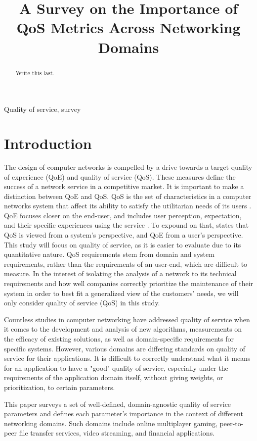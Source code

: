 \documentclass{article}
\title{A Survey on the Importance of QoS Metrics Across Networking Domains}
\begin{document}
%
\maketitle
%
\begin{abstract}
Write this last.
\end{abstract}
%
\begin{keywords}
Quality of service, survey
\end{keywords}
%
\section{Introduction}
The design of computer networks is compelled by a drive towards a target quality of experience (QoE) and quality of service (QoS). These measures define the success of 
a network service in a competitive market. It is important to make a distinction between QoE and QoS. QoS is the set of characteristics in a computer networks system that 
affect its ability to satisfy the utilitarian needs of its users \cite{qoe_qos_2014}. QoE focuses closer on the end-user, and includes user perception, expectation, and 
their specific experiences using the service \cite{qoe_qos_2010}. To expound on that, \cite{qoe_qos_2014} states that QoS is viewed from a system's perspective, and QoE 
from a user's perspective. This study will focus on quality of service, as it is easier to evaluate due to its quantitative nature. QoS requirements stem from domain and 
system requirements, rather than the requirements of an user-end, which are difficult to measure. In the interest of isolating the analysis of a network to its technical 
requirements and how well companies correctly prioritize the maintenance of their system in order to best fit a generalized view of the customers' needs, we will only 
consider quality of service (QoS) in this study.

Countless studies in computer networking have addressed quality of service when it comes to the development and analysis of new algorithms, measurements on the efficacy of 
existing solutions, as well as domain-specific requirements for specific systems. However, various domains are differing standards on quality of service for their 
applications. It is difficult to correctly understand what it means for an application to have a "good" quality of service, especially under the requirements of the 
application domain itself, without giving weights, or prioritization, to certain parameters. 

This paper surveys a set of well-defined, domain-agnostic quality of service parameters and defines each parameter's importance in the context of different networking 
domains. Such domains include online multiplayer gaming, peer-to-peer file transfer services, video streaming, and financial applications. 
\end{document}
